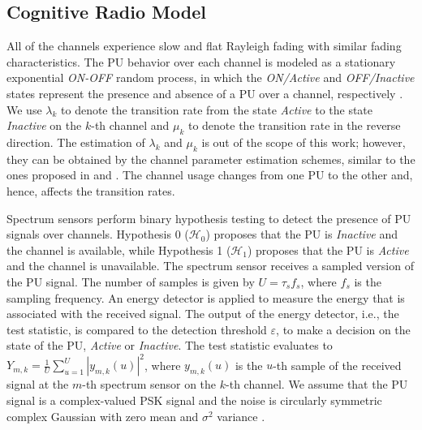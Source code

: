 \documentclass[journal]{IEEEtran} \ifCLASSINFOpdf
\begin{document}
\subsection{Cognitive Radio Model}
\label{subsec_cr}
All of the channels experience slow and flat Rayleigh fading with similar fading characteristics. The PU behavior over each channel is modeled as a stationary exponential \textit{ON-OFF} random process, in which the \textit{ON/Active} and \textit{OFF/Inactive} states represent the presence and absence of a PU over a channel, respectively . We use $\lambda_k$ to denote the transition rate from the state \textit{Active} to the state \textit{Inactive} on the $k$-th channel and $\mu_k$ to denote the transition rate in the reverse direction. The estimation of  $\lambda_k$ and $\mu_k$ is out of the scope of this work; however, they can be obtained by the channel parameter estimation schemes, similar to the ones proposed in \cite{Tehrani2012} and \cite{Kim2008}.  The channel usage changes from one PU to the other and, hence, affects the transition rates.



Spectrum sensors perform binary hypothesis testing to detect the presence of PU signals over channels. Hypothesis 0 ($\mathcal{H}_0$) proposes that the PU is \textit{Inactive} and the channel is available, while Hypothesis 1 ($\mathcal{H}_1$) proposes that the PU is \textit{Active} and the channel is unavailable. The spectrum sensor receives a sampled version of the PU signal. The number of samples is given by $U=\tau_s f_s$, where $f_s$ is the sampling frequency. An energy detector is applied to measure the energy that is associated with the received signal. The output of the energy detector, i.e., the test statistic, is compared to the detection threshold $\varepsilon$, to make a decision on the state of the PU, \textit{Active} or \textit{Inactive}. The test statistic evaluates to $Y_{m,k} = \frac{1}{U} \sum_{u=1}^U |y_{m,k}(u)|^2$, where $y_{m,k}(u)$ is the $u$-th sample of the received signal at the $m$-th spectrum sensor on the $k$-th channel. We assume that the PU signal is a complex-valued PSK signal and the noise is circularly symmetric complex Gaussian with zero mean and $\sigma^2$ variance \cite{Liang2008}.
\end{document}
